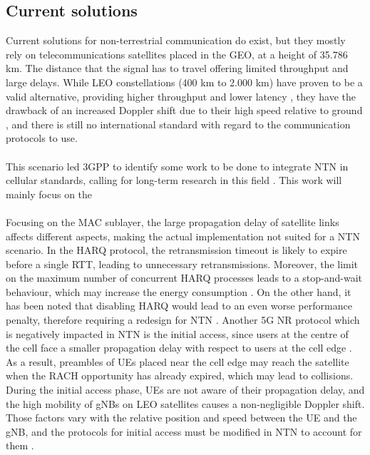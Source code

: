 \subsection{Current solutions}
Current solutions for non-terrestrial communication do exist, but they mostly rely on telecommunications satellites placed in the \ac{GEO}, at a height of 35.786 km. The distance that the signal has to travel offering limited throughput and large delays. While \ac{LEO} constellations (400 km to 2.000 km) have proven to be a valid alternative, providing higher throughput and lower latency \cite{main-features-5g-nr-ntn-yun}, they have the drawback of an increased Doppler shift due to their high speed relative to ground \cite{satellite-communication-mmwave-giordani}, and there is still no international standard with regard to the communication protocols to use. 

\paragraph{}
This scenario led \ac{3GPP} to identify some work to be done to integrate \ac{NTN} in cellular standards, calling for long-term research in this field \cite{satellite-communication-mmwave-giordani}. This work will mainly focus on the 

\paragraph{} Focusing on the \ac{MAC} sublayer, the large propagation delay of satellite links affects different aspects, making the actual implementation not suited for a \ac{NTN} scenario. In the \ac{HARQ} protocol, the retransmission timeout is likely to expire before a single \ac{RTT}, leading to unnecessary retransmissions. Moreover, the limit on the maximum number of concurrent \ac{HARQ} processes leads to a stop-and-wait behaviour, which may increase the energy consumption \cite{3gpp-tr-38.811}. On the other hand, it has been noted that disabling \ac{HARQ} would lead to an even worse performance penalty, therefore requiring a redesign for \ac{NTN} \cite{5g-beyond-5g-ntn-trends-vanellicoralli}. Another 5G \ac{NR} protocol which is negatively impacted in \ac{NTN} is the initial access, since users at the centre of the cell face a smaller propagation delay with respect to users at the cell edge \cite{5g-beyond-5g-ntn-trends-vanellicoralli} \cite{applying-nr-technologies-in-ntn-lee}. As a result, preambles of \ac{UE}s placed near the cell edge may reach the satellite when the \ac{RACH} opportunity has already expired, which may lead to collisions. During the initial access phase, \ac{UE}s are not aware of their propagation delay, and the high mobility of \ac{gNB}s on \ac{LEO} satellites causes a non-negligible Doppler shift. Those factors vary with the relative position and speed between the \ac{UE} and the \ac{gNB}, and the protocols for initial access must be modified in \ac{NTN} to account for them \cite{ntn-from-5g-6g-hassan}. 
